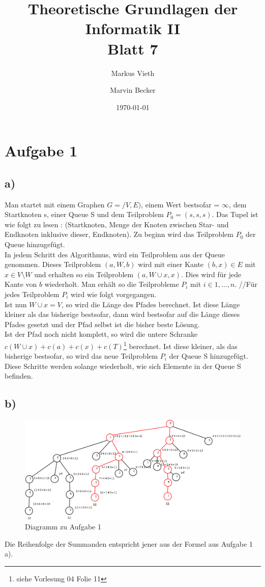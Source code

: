 \documentclass[a4paper,11pt,twoside]{article}
\title{Theoretische Grundlagen der Informatik II\\ Blatt 7}
\author{Markus Vieth \and Marvin Becker}
\date{\today}
\begin{document}
\maketitle
\cleardoublepage
\pagestyle{myheadings}

\section*{Aufgabe 1}
\subsection*{a)}
Man startet mit einem Graphen $G=/V,E)$, einem Wert \textrm{bestsofar} = $\infty$, dem Startknoten s, einer Queue S und dem Teilproblem $P_0 = (s,{s},s)$. Das Tupel ist wie folgt zu lesen : (Startknoten, Menge der Knoten zwischen Star- und Endknoten inklusive dieser, Endknoten).
Zu beginn wird das Teilproblem $P_0$ der Queue hinzugefügt.\\
In jedem Schritt des Algorithmus, wird ein Teilproblem aus der Queue genommen. Dieses Teilproblem $(a, W, b)$ wird mit einer Kante $(b, x)\in E $ mit $x\in V\setminus W$ und erhalten so ein Teilproblem $(a, W \cup {x}, x)$. Dies wird für jede Kante von $b$ wiederholt. Man erhält so die Teilprobleme $P_i$ mit $i\in {1,\ldots,n}$.
//Für jedes Teilproblem $P_i$ wird wie folgt vorgegangen.
\\Ist nun $W \cup {x} = V$, so wird die Länge des Pfades berechnet. Ist diese Länge kleiner als das bisherige \textrm{bestsofar}, dann wird \textrm{bestsofar} auf die Länge dieses Pfades gesetzt und der Pfad selbst ist die bisher beste Lösung.
\\Ist der Pfad noch nicht komplett, so wird die untere Schranke $c(W \cup {x})+c(a)+c(x)+c(T)$\footnote{siehe Vorlesung 04 Folie 11} berechnet. Ist diese kleiner, als das bisherige \textrm{bestsofar}, so wird das neue Teilproblem $P_i$ der Queue S hinzugefügt.\\
Diese Schritte werden solange wiederholt, wie sich Elemente in der Queue S befinden.\\

\subsection*{b)}
\begin{figure}[h]
	\hspace{-60pt}
\includegraphics[width=1.2\linewidth]{Baum}
\caption{Diagramm zu Aufgabe 1}
\label{fig:Baum}
\end{figure}
Die Reihenfolge der Summanden entspricht jener aus der Formel aus Aufgabe 1 a).
\end{document}

